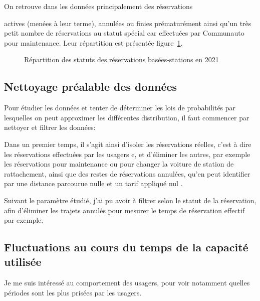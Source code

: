 \documentclass[12pt,a4paper]{article}
\newcommand{\1}[1]{\mathbbm{1}_{\{#1\}} }
\theoremstyle{definition}
\begin{document}
On retrouve dans les données principalement des réservations {actives (menées à leur terme), annulées ou finies prématurément ainsi qu'un très petit nombre de réservations au statut spécial car effectuées par Communauto pour maintenance. Leur répartition est présentée figure~\ref{Répartition}.

\begin{figure}[!h]
\centering
{}
\caption{Répartition des statuts des réservations basées-stations en 2021}
\label{Répartition}
\end{figure}
 	
 	
\subsection{Nettoyage préalable des  données}
Pour étudier les données et tenter de déterminer les lois de probabilités par lesquelles on peut approximer les différentes distribution, il faut commencer par nettoyer et filtrer les données:

Dans un premier temps, il s'agit ainsi d'isoler les réservations réelles, c'est à dire les réservations effectuées par les usagers e, et d'éliminer les autres, par exemple les réservations pour maintenance ou pour changer la voiture de station de rattachement, ainsi que des restes de réservations annulées, qu'en peut identifier par une distance parcourue nulle et un tarif appliqué nul  .
	

Suivant le paramètre étudié, j'ai pu avoir à filtrer selon le statut de la réservation, afin d'éliminer les trajets annulés pour mesurer le temps de réservation effectif par exemple.



\subsection{Fluctuations au cours du temps de la capacité utilisée}


Je me suis intéressé au comportement des usagers, pour voir notamment quelles périodes sont les plus prisées par les usagers.

}
\end{document}
